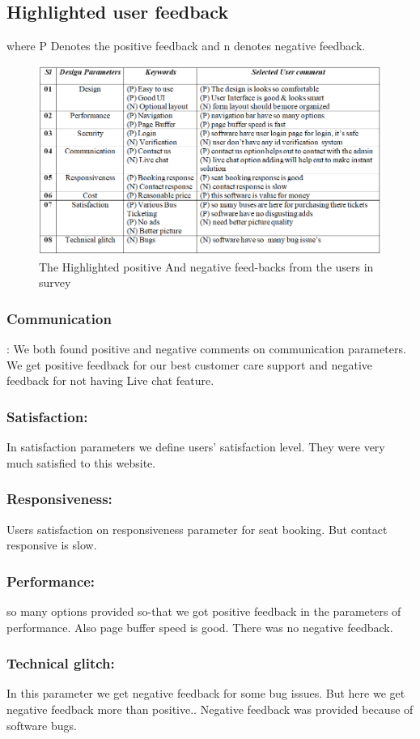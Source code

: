 \documentclass[runningheads]{llncs}
\begin{document}
\subsection{Highlighted user feedback}
where P Denotes the positive feedback and n denotes negative feedback.
\begin{figure}[h]
\centerline{\includegraphics[width=5 in]{highlightes.png}}
\caption{The Highlighted positive And negative feed-backs from the users in survey}
\label{fig}
\end{figure}
\subsubsection{Communication}: We both found positive and negative comments on communication parameters. We get positive feedback for our best customer care support and negative feedback for not having Live chat feature.
\subsubsection{Satisfaction:} In satisfaction parameters we define users' satisfaction level. They were very much satisfied to this website.
\subsubsection{Responsiveness:} Users satisfaction on responsiveness parameter for seat booking. But contact responsive is slow.

\subsubsection{Performance:}so many options provided so-that we got positive feedback in the parameters of performance. Also page buffer speed is good. There was no negative feedback. \subsubsection{Technical glitch:} In this parameter we get negative feedback for some bug issues. But here we get negative feedback more than positive.. Negative feedback was provided because of software bugs.
\end{document}
